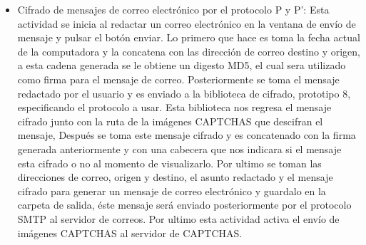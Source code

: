 \begin{itemize}
 \item Cifrado de mensajes de correo electrónico por el protocolo P y P’: Esta actividad se inicia al redactar un correo electrónico en la ventana de envío de mensaje y pulsar el botón enviar. 
Lo primero que hace es toma la fecha actual de la computadora y la concatena con las dirección de correo destino y origen, a esta cadena generada  se le  obtiene un digesto MD5, el cual sera utilizado como firma para el mensaje de correo. Posteriormente se toma el mensaje redactado por el usuario y es enviado a la biblioteca de cifrado, prototipo 8, especificando el protocolo a usar. Esta biblioteca nos regresa el mensaje cifrado junto con la ruta de la imágenes CAPTCHAS que descifran el mensaje, Después se toma este mensaje cifrado y es concatenado con la firma generada anteriormente  y con una cabecera que nos indicara si el mensaje esta cifrado o no al momento de visualizarlo. Por ultimo se toman las direcciones de correo, origen y destino, el asunto redactado y el mensaje cifrado para generar un mensaje de correo electrónico y guardalo en la carpeta de salida, éste mensaje será enviado posteriormente por el protocolo SMTP al servidor de correos. Por ultimo esta actividad activa el envío de imágenes CAPTCHAS al servidor de CAPTCHAS.
 

\end{itemize}
